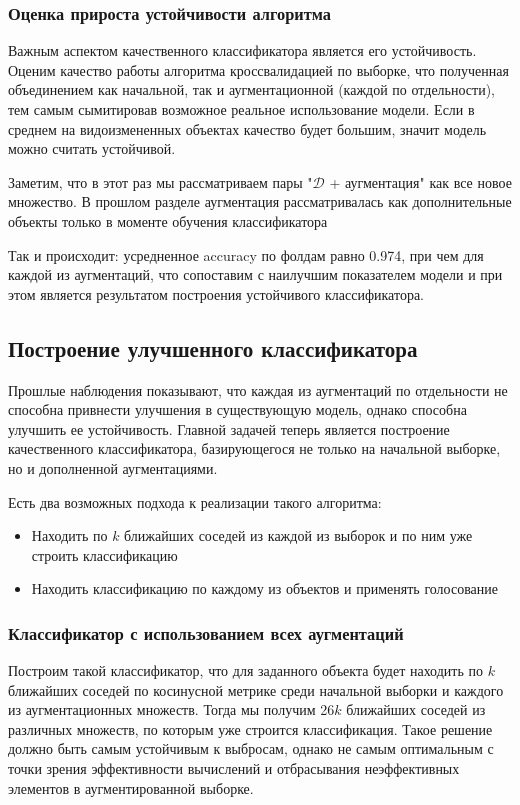 \documentclass{article}
\begin{document}
        \subsubsection{Оценка прироста устойчивости алгоритма}
            Важным аспектом качественного классификатора является его устойчивость. Оценим качество работы алгоритма кроссвалидацией по выборке, что полученная объединением как начальной, так и аугментационной (каждой по отдельности), тем самым сымитировав возможное реальное использование модели. Если в среднем на видоизмененных объектах качество будет большим, значит модель можно считать устойчивой.

            \begin{leftrule}
                Заметим, что в этот раз мы рассматриваем пары "$\mathcal{D}$ + аугментация" как все новое множество. В прошлом разделе аугментация рассматривалась как дополнительные объекты только в моменте обучения классификатора
            \end{leftrule}

            Так и происходит: усредненное accuracy по фолдам равно 0.974, при чем для каждой из аугментаций, что сопоставим с наилучшим показателем модели и при этом является результатом построения устойчивого классификатора.

    \subsection{Построение улучшенного классификатора}
        Прошлые наблюдения показывают, что каждая из аугментаций по отдельности не способна привнести улучшения в существующую модель, однако способна улучшить ее устойчивость. Главной задачей теперь является построение качественного классификатора, базирующегося не только на начальной выборке, но и дополненной аугментациями.

        Есть два возможных подхода к реализации такого алгоритма: 
        \begin{itemize}
            \item Находить по $k$ ближайших соседей из каждой из выборок и по ним уже строить классификацию
            \item Находить классификацию по каждому из объектов и применять голосование
        \end{itemize}

        \subsubsection{Классификатор с использованием всех аугментаций}
            Построим такой классификатор, что для заданного объекта будет находить по $k$ ближайших соседей по косинусной метрике среди начальной выборки и каждого из аугментационных множеств. Тогда мы получим 26$k$ ближайших соседей из различных множеств, по которым уже строится классификация. Такое решение должно быть самым устойчивым к выбросам, однако не самым оптимальным с точки зрения эффективности вычислений и отбрасывания неэффективных элементов в аугментированной выборке. 
\end{document}
